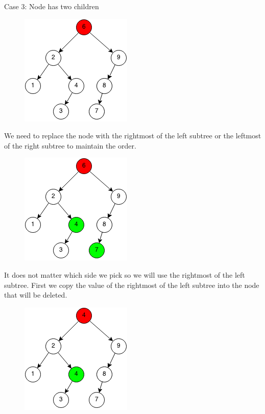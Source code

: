 \documentclass[11pt,oneside]{book}
\makeatletter
\def\maxwidth#1{\ifdim\Gin@nat@width>#1 #1\else\Gin@nat@width\fi}
\makeatother
\begin{document}
Case 3: Node has two children

\vspace{5px}\begin{figure}[H]\centering
        \includegraphics[width=0.66\maxwidth{\textwidth}]{bst-rem-case31.png}
        \end{figure}

We need to replace the node with the rightmost of the left subtree or the leftmost of the right subtree to maintain the order.

\vspace{5px}\begin{figure}[H]\centering
        \includegraphics[width=0.66\maxwidth{\textwidth}]{bst-rem-case32.png}
        \end{figure}

It does not matter which side we pick so we will use the rightmost of the left subtree. First we copy the value of the rightmost of the left subtree into the node that will be deleted.

\vspace{5px}\begin{figure}[H]\centering
        \includegraphics[width=0.66\maxwidth{\textwidth}]{bst-rem-case33.png}
        \end{figure}
\end{document}
